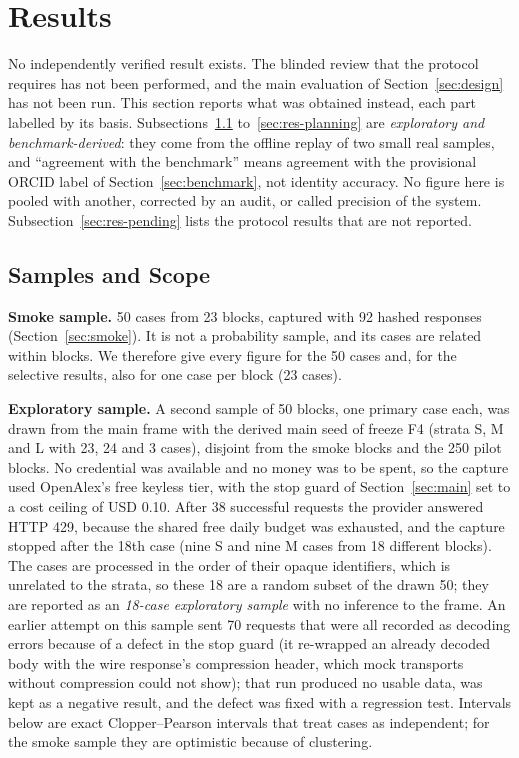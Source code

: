 \section{Results}
\label{sec:results}
No independently verified result exists. The blinded review that the protocol requires has not been performed, and the main evaluation of Section~\ref{sec:design} has not been run. This section reports what was obtained instead, each part labelled by its basis. Subsections~\ref{sec:res-samples} to~\ref{sec:res-planning} are \emph{exploratory and benchmark-derived}: they come from the offline replay of two small real samples, and ``agreement with the benchmark'' means agreement with the provisional ORCID label of Section~\ref{sec:benchmark}, not identity accuracy. No figure here is pooled with another, corrected by an audit, or called precision of the system. Subsection~\ref{sec:res-pending} lists the protocol results that are not reported.

\subsection{Samples and Scope}
\label{sec:res-samples}
\textbf{Smoke sample.} 50 cases from 23 blocks, captured with 92 hashed responses (Section~\ref{sec:smoke}). It is not a probability sample, and its cases are related within blocks. We therefore give every figure for the 50 cases and, for the selective results, also for one case per block (23 cases).

\textbf{Exploratory sample.} A second sample of 50 blocks, one primary case each, was drawn from the main frame with the derived main seed of freeze F4 (strata S, M and L with 23, 24 and 3 cases), disjoint from the smoke blocks and the 250 pilot blocks. No credential was available and no money was to be spent, so the capture used OpenAlex's free keyless tier, with the stop guard of Section~\ref{sec:main} set to a cost ceiling of USD 0.10. After 38 successful requests the provider answered HTTP 429, because the shared free daily budget was exhausted, and the capture stopped after the 18th case (nine S and nine M cases from 18 different blocks). The cases are processed in the order of their opaque identifiers, which is unrelated to the strata, so these 18 are a random subset of the drawn 50; they are reported as an \emph{18-case exploratory sample} with no inference to the frame. An earlier attempt on this sample sent 70 requests that were all recorded as decoding errors because of a defect in the stop guard (it re-wrapped an already decoded body with the wire response's compression header, which mock transports without compression could not show); that run produced no usable data, was kept as a negative result, and the defect was fixed with a regression test. Intervals below are exact Clopper--Pearson intervals that treat cases as independent; for the smoke sample they are optimistic because of clustering.

